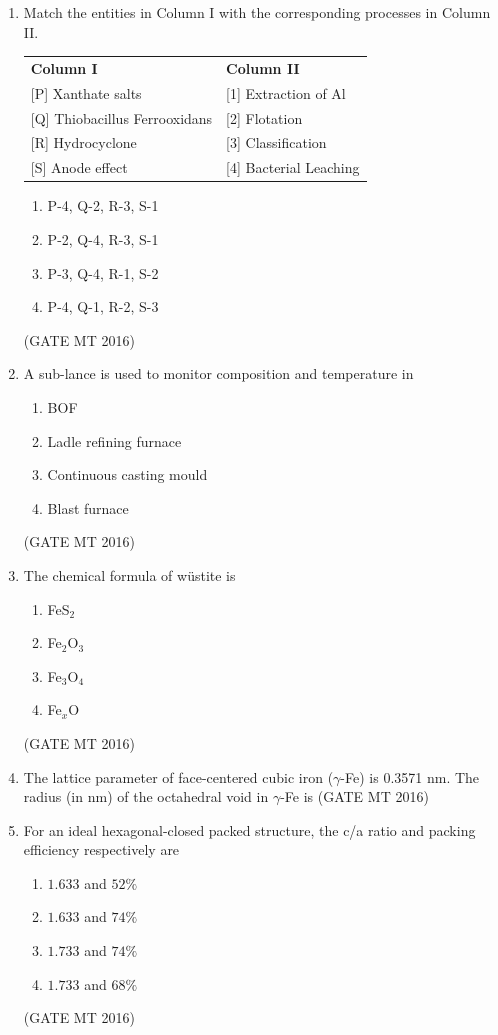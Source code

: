 \documentclass[journal, 11pt, onecolumn]{IEEEtran}
\theoremstyle{remark}
\begin{document}
\begin{enumerate}
\item Match the entities in Column I with the corresponding processes in Column II.  

\begin{tabular}{ll}
\textbf{Column I} & \textbf{Column II} \\
{[P]} Xanthate salts & {[1]} Extraction of Al \\
{[Q]} Thiobacillus Ferrooxidans & {[2]} Flotation \\
{[R]} Hydrocyclone & {[3]} Classification \\
{[S]} Anode effect & {[4]} Bacterial Leaching \\
\end{tabular}

\begin{enumerate}
\item P-4, Q-2, R-3, S-1
\item P-2, Q-4, R-3, S-1
\item P-3, Q-4, R-1, S-2
\item P-4, Q-1, R-2, S-3
\end{enumerate}
\hfill(GATE MT 2016)

\item A sub-lance is used to monitor composition and temperature in
\begin{enumerate}
\item BOF
\item Ladle refining furnace
\item Continuous casting mould
\item Blast furnace
\end{enumerate}
\hfill(GATE MT 2016)

\item The chemical formula of wüstite is
\begin{enumerate}
\item FeS$_2$
\item Fe$_2$O$_3$
\item Fe$_3$O$_4$
\item Fe$_x$O
\end{enumerate}
\hfill(GATE MT 2016)

\item The lattice parameter of face-centered cubic iron ($\gamma$-Fe) is 0.3571 nm. The radius (in nm) of the octahedral void in $\gamma$-Fe is
\hfill(GATE MT 2016)

\item For an ideal hexagonal-closed packed structure, the c/a ratio and packing efficiency
respectively are
\begin{multicols}{2}
\begin{enumerate}
\item $1.633$ and $52\%$
\item $1.633$ and $74\%$
\item $1.733$ and $74\%$
\item $1.733$ and $68\%$
\end{enumerate}
\end{multicols}
\hfill(GATE MT 2016)


\end{enumerate}
\end{document}
